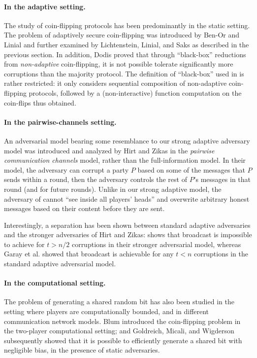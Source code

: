 \documentclass[11pt,letterpaper]{article}
\theoremstyle{plain}
\theoremstyle{definition}
\begin{document}
\paragraph{In the adaptive setting.}
The study of coin-flipping protocols has been predominantly in the static setting.
The problem of adaptively secure coin-flipping was introduced by Ben-Or and Linial \cite{BL85}
and further examined by Lichtenstein, Linial, and Saks \cite{LLS89} as described in the previous section.
In addition, Dodis \cite{Dod00} proved that through ``black-box'' reductions from \emph{non-adaptive} coin-flipping, it is not possible tolerate
significantly more corruptions than the majority protocol. The definition of ``black-box'' used in \cite{Dod00}
is rather restricted: it only considers sequential composition of non-adaptive coin-flipping protocols, followed by a (non-interactive)
function computation on the coin-flips thus obtained.

\paragraph{In the pairwise-channels setting.}
An adversarial model bearing some resemblance to our strong adaptive adversary model was introduced and analyzed by Hirt and Zikas \cite{HZ10}
in the \emph{pairwise communication channels} model, rather than the full-information model. In their model, the adversary can corrupt a party $P$ based on
some of the messages that $P$ sends within a round, then the adversary controls the rest of $P$'s messages in that round (and for future rounds).
Unlike in our strong adaptive model, the adversary of \cite{HZ10} cannot ``see inside all players' heads'' 
and overwrite arbitrary honest messages based on their content before they are sent.

Interestingly, a separation has been shown between standard adaptive adversaries and the stronger adversaries of Hirt and Zikas:
\cite{HZ10} shows that broadcast is impossible to achieve for $t>n/2$ corruptions in their stronger adversarial model,
whereas Garay et al. \cite{GKKZ11} showed that broadcast is achievable for any $t<n$ corruptions in the standard adaptive adversarial model.

\paragraph{In the computational setting.}
The problem of generating a shared random bit has also been studied in the setting where players are computationally bounded,
and in different communication network models. Blum \cite{Blu81} introduced the coin-flipping problem in the two-player computational setting; and
Goldreich, Micali, and Wigderson \cite{GMW87} subsequently showed that it is possible to efficiently generate a shared bit with negligible bias, in the presence of static adversaries.
\end{document}
